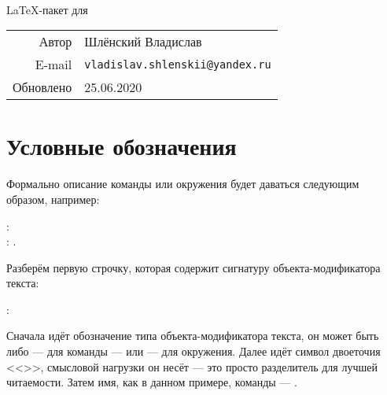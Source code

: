 \newpage 

\thispagestyle{empty}

\vspace*{7cm}
\begin{center}
    { \huge {} } \\[1cm]
    { \Large \LaTeX-пакет для  }\\
\end{center}


\vspace*{7cm}
\begin{flushright}
    \begin{tabular}{@{}r@{\hskip .75cm}l@{}}
        Автор       &  Шлёнский Владислав \\
        E-mail      & \texttt{vladislav.shlenskii@yandex.ru} \\
        Обновлено   & 25.06.2020
    \end{tabular}
\end{flushright}


\newpage

\tableofcontents

\newpage


\section{Условные обозначения}

Формально описание команды или окружения будет даваться следующим образом, например:
\begin{tcolorbox}
    \small \rsTypeAux: \\
    \hspace*{1cm} \rsOptionsAux: . 
\end{tcolorbox}

Разберём первую строчку, которая содержит сигнатуру объекта-модификатора текста:
\begin{center}
    \rsTypeAux:
\end{center}
Сначала идёт обозначение типа объекта-модификатора текста, он может быть либо \rsTypeAux\space --- для команды --- или \rsTypeAux[env] --- для окружения. Далее идёт символ двоеточия <<\rsCodeAux{:}>>, смысловой нагрузки он несёт --- это просто разделитель для лучшей читаемости. Затем имя, как в данном примере, команды --- . 

